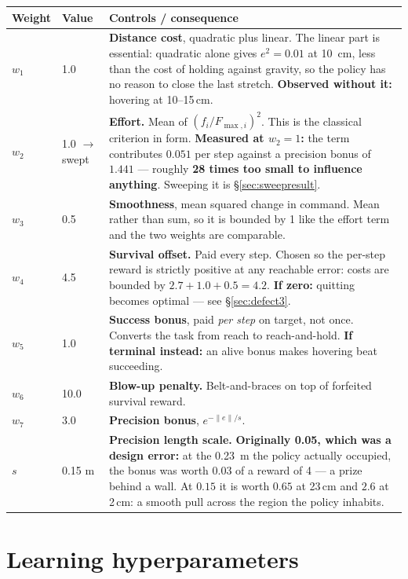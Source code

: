 \begin{longtable}{@{} L{1.6cm} C{1.6cm} L{11.2cm} @{}}
\toprule
\textbf{Weight} & \textbf{Value} & \textbf{Controls / consequence} \\
\midrule
\endhead
$w_1$ & 1.0 & \textbf{Distance cost}, quadratic plus linear. The linear part is essential: quadratic alone gives $e^2 = 0.01$ at \SI{10}{\centi\meter}, less than the cost of holding against gravity, so the policy has no reason to close the last stretch. \textbf{Observed without it:} hovering at 10--15\,cm. \\
$w_2$ & 1.0 $\rightarrow$ swept & \textbf{Effort.} Mean of $(f_i/F_{\max,i})^2$. This is the classical criterion in form. \textbf{Measured at $w_2=1$:} the term contributes $0.051$ per step against a precision bonus of $1.441$ --- roughly \textbf{28 times too small to influence anything}. Sweeping it is \S\ref{sec:sweepresult}. \\
$w_3$ & 0.5 & \textbf{Smoothness}, mean squared change in command. Mean rather than sum, so it is bounded by 1 like the effort term and the two weights are comparable. \\
$w_4$ & 4.5 & \textbf{Survival offset.} Paid every step. Chosen so the per-step reward is strictly positive at any reachable error: costs are bounded by $2.7 + 1.0 + 0.5 = 4.2$. \textbf{If zero:} quitting becomes optimal --- see \S\ref{sec:defect3}. \\
$w_5$ & 1.0 & \textbf{Success bonus}, paid \emph{per step} on target, not once. Converts the task from reach to reach-and-hold. \textbf{If terminal instead:} an alive bonus makes hovering beat succeeding. \\
$w_6$ & 10.0 & \textbf{Blow-up penalty.} Belt-and-braces on top of forfeited survival reward. \\
$w_7$ & 3.0 & \textbf{Precision bonus}, $e^{-\|e\|/s}$. \\
$s$ & 0.15 m & \textbf{Precision length scale.} \textbf{Originally 0.05, which was a design error:} at the \SI{0.23}{\meter} the policy actually occupied, the bonus was worth $0.03$ of a reward of 4 --- a prize behind a wall. At $0.15$ it is worth $0.65$ at 23\,cm and $2.6$ at 2\,cm: a smooth pull across the region the policy inhabits. \\
\bottomrule
\end{longtable}

\section{Learning hyperparameters}


